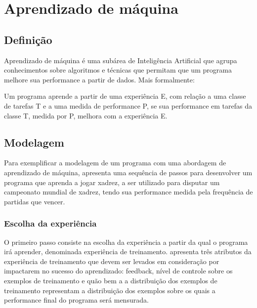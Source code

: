 \chapter{Aprendizado de máquina}

\section{Definição}

Aprendizado de máquina é uma subárea de Inteligência Artificial que agrupa conhecimentos sobre algoritmos e técnicas que permitam que um programa melhore sua performance a partir de dados. Mais formalmente:

\begin{citacao}
Um programa aprende a partir de uma experiência E, com relação a uma classe de tarefas T e a uma medida de performance P, se sua performance em tarefas da classe T, medida por P, melhora com a experiência E. \cite[p.2, tradução nossa]{Tom_mitchell}
\end{citacao}


\section{Modelagem}

Para exemplificar a modelagem de um programa com uma abordagem de aprendizado de máquina, \cite{Tom_mitchell} apresenta uma sequência de passos para desenvolver um programa que aprenda a jogar xadrez, a ser utilizado para disputar um campeonato mundial de xadrez, tendo sua performance medida pela frequência de partidas que vencer.

\subsection*{Escolha da experiência}

O primeiro passo consiste na escolha da experiência a partir da qual o programa irá aprender, denominada experiência de treinamento. 
\cite{Tom_mitchell} apresenta três atributos da experiência de treinamento que devem ser levados em consideração por impactarem no sucesso do aprendizado: feedback, nível de controle sobre os exemplos de treinamento e quão bem a a distribuição dos exemplos de treinamento representam a distribuição dos exemplos sobre os quais a performance final do programa será mensurada.

